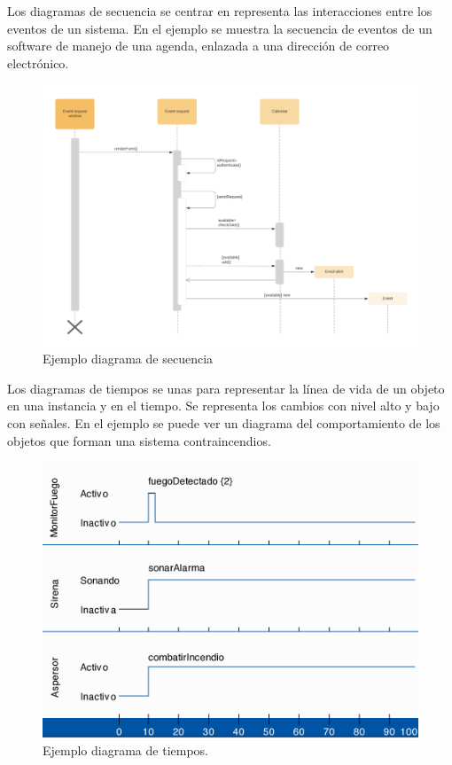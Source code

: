 \documentclass[a4paper, 12pt]{book}
\begin{document}
Los diagramas de secuencia se centrar en representa las interacciones entre los eventos de un sistema. En el ejemplo se muestra la secuencia de eventos de un software de manejo de una agenda, enlazada a una dirección de correo electrónico.
\begin{figure}
	\centering
	\includegraphics[width=14cm, keepaspectratio]{img/diagrama_secuencia.png}
	\caption{Ejemplo diagrama de secuencia}\label{fig:diagrama_secuencia}
\end{figure}

Los diagramas de tiempos se unas para representar la línea de vida de un objeto en una instancia y en el tiempo. Se representa los cambios con nivel alto y bajo con señales. En el ejemplo se puede ver un diagrama del comportamiento de los objetos que forman una sistema contraincendios.
\begin{figure}
	\centering
	\includegraphics[width=12cm, keepaspectratio]{img/diagrama_tiempos.png}
	\caption{Ejemplo diagrama de tiempos.}\label{fig:diagrama_tiempos}
\end{figure}
\end{document}
